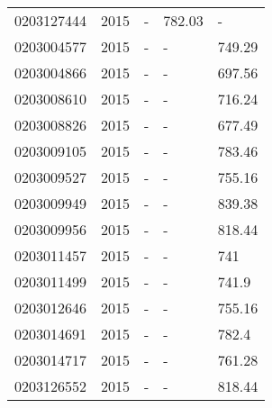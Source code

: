 \begin{table}
\begin{tabular}[t]{lrlll}
0203127444 & 2015 & - & 782.03 & -\\
0203004577 & 2015 & - & - & 749.29\\
0203004866 & 2015 & - & - & 697.56\\
0203008610 & 2015 & - & - & 716.24\\
0203008826 & 2015 & - & - & 677.49\\
0203009105 & 2015 & - & - & 783.46\\
0203009527 & 2015 & - & - & 755.16\\
0203009949 & 2015 & - & - & 839.38\\
0203009956 & 2015 & - & - & 818.44\\
0203011457 & 2015 & - & - & 741\\
0203011499 & 2015 & - & - & 741.9\\
0203012646 & 2015 & - & - & 755.16\\
0203014691 & 2015 & - & - & 782.4\\
0203014717 & 2015 & - & - & 761.28\\
0203126552 & 2015 & - & - & 818.44\\
\bottomrule
\end{tabular}
\end{table}